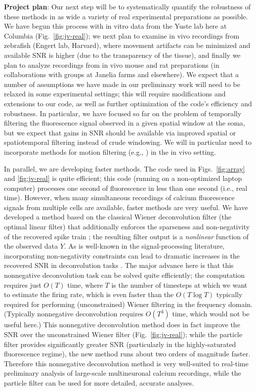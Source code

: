 \documentclass[12pt]{article}
\begin{document}
\noindent \textbf{Project plan}: Our next step will be to
systematically quantify the robustness of these methods in as wide a
variety of real experimental preparations as possible.  We have begun
this process with in vitro data from the Yuste lab here at Columbia
(Fig.~\ref{fig:jv-real}); we next plan to examine in vivo recordings
from zebrafish (Engert lab, Harvard), where movement artifacts can be
minimized and available SNR is higher (due to the transparency of the
tissue), and finally we plan to analyze recordings from in vivo mouse
and rat preparations (in collaborations with groups at Janelia farms
and elsewhere).  We expect that a number of assumptions we have made
in our preliminary work will need to be relaxed in some experimental
settings; this will require modifications and extensions to our code,
as well as further optimization of the code's efficiency and
robustness.  In particular, we have focused so far on the problem of
temporally filtering the fluorescence signal observed in a given
spatial window at the soma, but we expect that gains in SNR should be
available via improved spatial or spatiotemporal filtering instead of
crude windowing.  We will in particular need to incorporate methods
for motion filtering (e.g., \cite{DombeckTank07}) in the in vivo
setting.

In parallel, we are developing faster methods.  The code used in
Figs.~\ref{fig:array} and \ref{fig:jv-real} is quite efficient; this
code (running on a non-optimized laptop computer) processes one second
of fluorescence in less than one second (i.e., real time).  However,
when many simultaneous recordings of calcium fluorescence signals from
multiple cells are available, faster methods are very useful.  We have
developed a method based on the classical Wiener deconvolution filter
(the optimal linear filter) that additionally enforces the sparseness
and non-negativity of the recovered spike train \cite{Vogelstein08};
the resulting filter output is a \emph{nonlinear} function of the
observed data $Y$.  As is well-known in the signal-processing
literature, incorporating non-negativity constraints can lead to
dramatic increases in the recovered SNR in deconvolution tasks
\cite{LLS04,HAP06,PanFerr08}.  The major advance here is that this
nonnegative deconvolution task can be solved quite efficiently; the
computation requires just $O(T)$ time, where $T$ is the number of
timesteps at which we want to estimate the firing rate, which is even
faster than the $O(T \log T)$ typically required for performing
(unconstrained) Wiener filtering in the frequency domain.  (Typically
nonnegative deconvolution requires $O(T^3)$ time, which would not be
useful here.)  This nonnegative deconvolution method does in fact
improve the SNR over the unconstrained Wiener filter
(Fig.~\ref{fig:jv-real}); while the particle filter provides
significantly greater SNR (particularly in the highly-saturated
fluorescence regime), the new method runs about two orders of
magnitude faster.  Therefore this nonnegative deconvolution method is
very well-suited to real-time preliminary analysis of large-scale
multineuronal calcium recordings, while the particle filter can be
used for more detailed, accurate analyses.
\end{document}
